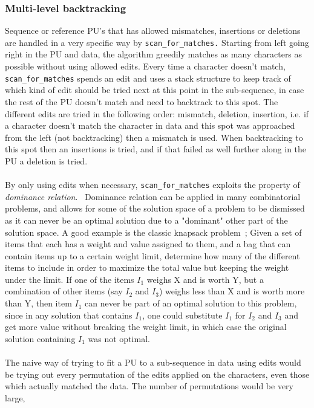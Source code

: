 \documentclass[12pt]{article}
\newcommand{\scm}{\texttt{scan\_for\_matches} }
\newcommand{\scmp}{\texttt{scan\_for\_matches.} }
\newcommand{\pu}{PU }
\newcommand{\pus}{PU's }
\begin{document}
\subsubsection{Multi-level backtracking}
Sequence or reference \pus that has allowed mismatches, insertions or deletions are handled in a very specific way by \scmp
Starting from left going right in the \pu
and data, the algorithm greedily matches as many characters as possible without using allowed edits.
Every time a character doesn't match, \scm spends an edit and uses a stack structure to keep track of which
kind of edit should be tried next at this point in the sub-sequence, in case the rest of the \pu doesn't match and need to
backtrack to this spot. The different edits are tried in the following order: mismatch, deletion, insertion, i.e.
if a character doesn't match the character in data and this spot was approached from the left (not backtracking)
then a mismatch is used. When backtracking to this spot then an insertions is tried, and if that failed as well further along 
in the \pu a deletion is tried. \\ \\
By only using edits when necessary, \scm exploits the property of \emph{dominance relation}.~\cite{dom}
Dominance relation can be applied in many combinatorial problems, and allows for some of the solution
space of a problem to be dismissed as it can never be an optimal solution due to a "dominant" other part of the solution space. 
A good example is the classic knapsack problem~\cite{knap}; 
Given a set of items that each has a weight and value assigned to them,
and a bag that can contain items up to a certain weight limit, determine how many of the different items to
include in order to maximize the total value but keeping the weight under the limit. If one of the items $I_1$ weighs
X and is worth Y, but a combination of other items (say $I_2$ and $I_3$) weighs less than X and is worth more than Y, 
then item $I_1$ can never be part of an optimal solution to this problem, since in any solution that contains $I_1$, 
one could substitute $I_1$ for $I_2$ and $I_3$ and get more value without breaking the weight limit, in which case the 
original solution containing $I_1$ was not optimal. \\ \\
The naive way of trying to fit a \pu to a sub-sequence in data using edits would be trying out every permutation of the edits
applied on the characters, even those which actually matched the data. The number of permutations would be very large,
\end{document}
